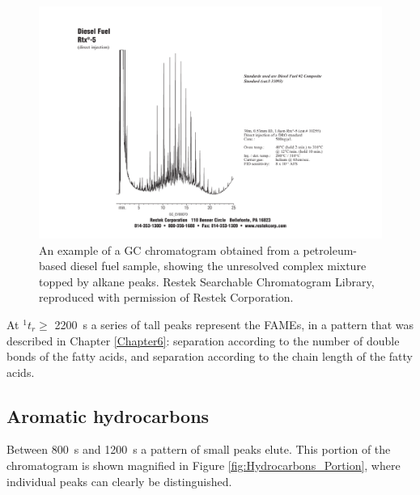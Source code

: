 \begin{figure}
	\centering
	\includegraphics[width=\textwidth]{Figures/hchump.pdf}
	\decoRule	
	
\caption[An example of a petrochemical fuel chromatogram.]{An example of a GC
chromatogram obtained from a petroleum-based diesel fuel sample, showing the
unresolved complex mixture topped by alkane peaks. Restek Searchable
Chromatogram Library, reproduced with permission of Restek Corporation.}
	
	\label{fig:HCHump} 
\end{figure}

At \(^{1}t_{r} \geq \) \SI{2200}{\second} a series of tall peaks represent the
FAMEs, in a pattern that was described in Chapter \ref{Chapter6}: \oneD
separation according to the number of double bonds of the fatty acids, and \twoD
separation according to the chain length of the fatty acids.


\subsection{Aromatic hydrocarbons}

Between \SI{800}{\second} and \SI{1200}{\second} a pattern of small peaks elute.
This portion of the chromatogram is shown magnified in Figure
\ref{fig:Hydrocarbons_Portion}, where individual peaks can clearly be distinguished.

